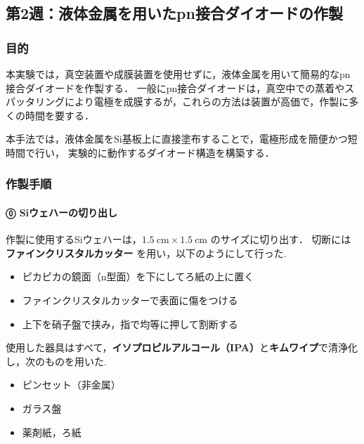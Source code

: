 \subsection{第2週：液体金属を用いたpn接合ダイオードの作製}

\subsubsection*{目的}

本実験では，真空装置や成膜装置を使用せずに，液体金属を用いて簡易的なpn接合ダイオードを作製する．  
一般にpn接合ダイオードは，真空中での蒸着やスパッタリングにより電極を成膜するが，これらの方法は装置が高価で，作製に多くの時間を要する．

本手法では，液体金属をSi基板上に直接塗布することで，電極形成を簡便かつ短時間で行い，
実験的に動作するダイオード構造を構築する．


\subsubsection*{作製手順}

\paragraph{⓪ Siウェハーの切り出し}

作製に使用するSiウェハーは，$1.5~\mathrm{cm} \times 1.5~\mathrm{cm}$ のサイズに切り出す．  
切断には \textbf{ファインクリスタルカッター} を用い，以下のようにして行った.

\begin{itemize}
    \item ピカピカの鏡面（n型面）を下にしてろ紙の上に置く
    \item ファインクリスタルカッターで表面に傷をつける
    \item 上下を硝子盤で挟み，指で均等に押して割断する
\end{itemize}

使用した器具はすべて，\textbf{イソプロピルアルコール（IPA）}と\textbf{キムワイプ}で清浄化し，次のものを用いた.


\begin{itemize}
    \item ピンセット（非金属）
    \item ガラス盤
    \item 薬剤紙，ろ紙
\end{itemize}

